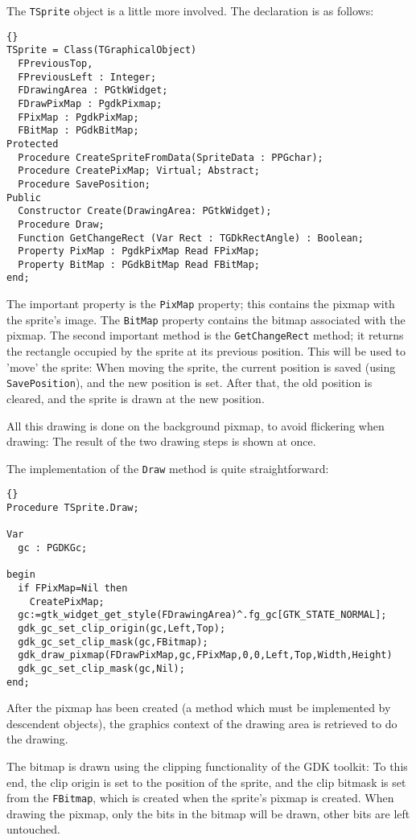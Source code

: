 \documentclass[10pt]{article}
\newcommand{\var}[1]{\texttt{#1}}
\begin{document}
The \var{TSprite} object is a little more involved. The declaration is 
as follows:
\begin{lstlisting}{}
TSprite = Class(TGraphicalObject)
  FPreviousTop,
  FPreviousLeft : Integer;
  FDrawingArea : PGtkWidget;
  FDrawPixMap : PgdkPixmap;
  FPixMap : PgdkPixMap;
  FBitMap : PGdkBitMap;
Protected
  Procedure CreateSpriteFromData(SpriteData : PPGchar);
  Procedure CreatePixMap; Virtual; Abstract; 
  Procedure SavePosition;
Public
  Constructor Create(DrawingArea: PGtkWidget);
  Procedure Draw;    
  Function GetChangeRect (Var Rect : TGDkRectAngle) : Boolean;
  Property PixMap : PgdkPixMap Read FPixMap;
  Property BitMap : PGdkBitMap Read FBitMap; 
end;
\end{lstlisting}{}
The important property is the \var{PixMap} property; this contains the
pixmap with the sprite's image. The \var{BitMap} property contains the
bitmap associated with the pixmap. The second important method is the
\var{GetChangeRect} method; it returns the rectangle occupied by the
sprite at its previous position. This will be used to 'move' the sprite:
When moving the sprite, the current position is saved (using
\var{SavePosition}), and the new position is set. After that, the old 
position is cleared, and the sprite is drawn at the new position. 

All this drawing is done on the background pixmap, to avoid flickering 
when drawing: The result of the two drawing steps is shown at once.

The implementation of the \var{Draw} method is quite straightforward:
\begin{lstlisting}{}
Procedure TSprite.Draw;    

Var
  gc : PGDKGc;
  
begin
  if FPixMap=Nil then
    CreatePixMap;    
  gc:=gtk_widget_get_style(FDrawingArea)^.fg_gc[GTK_STATE_NORMAL];
  gdk_gc_set_clip_origin(gc,Left,Top);
  gdk_gc_set_clip_mask(gc,FBitmap);
  gdk_draw_pixmap(FDrawPixMap,gc,FPixMap,0,0,Left,Top,Width,Height)
  gdk_gc_set_clip_mask(gc,Nil);  
end;
\end{lstlisting}{}
After the pixmap has been created (a method which must be implemented by
descendent objects), the graphics context of the drawing area is retrieved 
to do the drawing.

The bitmap is drawn using the clipping functionality of the GDK toolkit:
To this end, the clip origin is set to the position of the sprite, and
the clip bitmask is set from the \var{FBitmap}, which is created when the
sprite's pixmap is created. When drawing the pixmap, only the bits in the
bitmap will be drawn, other bits are left untouched.
\end{document}
